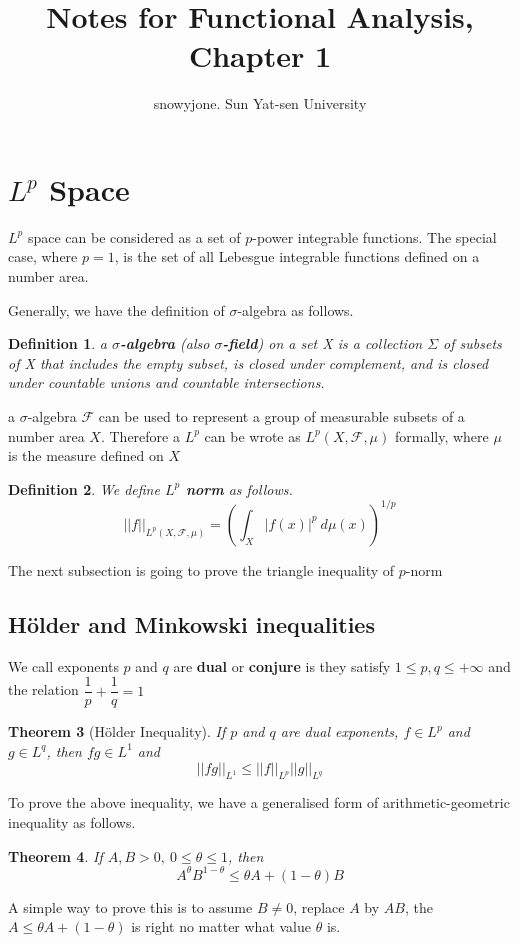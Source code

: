 \documentclass[11pt, a4paper]{article}
\theoremstyle{plain}
\newtheorem{thm}{Theorem}[section]
\newtheorem{defn}[thm]{Definition} %
\begin{document}
\title{Notes for Functional Analysis, Chapter 1}
\author{snowyjone. Sun Yat-sen University}
\maketitle

\section{$L^p$ Space}

$L^p$ space can be considered as a set of $p$-power integrable functions. The special case, where $p=1$, is the set of all Lebesgue integrable functions defined on a number area. 

Generally, we have the definition of $\sigma$-algebra as follows.
\begin{defn}
	a \textbf{$\sigma$-algebra} (also \textbf{$\sigma$-field}) on a set X is a collection $\Sigma$ of subsets of X that includes the empty subset, is closed under complement, and is closed under countable unions and countable intersections.
\end{defn}
a $\sigma$-algebra $\mathscr{F}$ can be used to represent a group of measurable subsets of a number area $X$. Therefore a $L^p$ can be wrote as $L^p(X,\mathscr{F},\mu)$ formally, where $\mu$ is the measure defined on $X$
\begin{defn}
	We define \textbf{$L^p$ norm} as follows.
	\[||f||_{L^p(X,\mathscr{F},\mu)}=\left(\int_X|f(x)|^p~d\mu(x)\right)^{1/p}\]
\end{defn}
The next subsection is going to prove the triangle inequality of $p$-norm

\subsection{H\"older and Minkowski inequalities}
We call exponents $p$ and $q$ are \textbf{dual} or \textbf{conjure} is they satisfy $1\le p,q\le+\infty$ and the relation $\dfrac{1}{p}+\dfrac{1}{q}=1$

\begin{thm}[H\"older Inequality]
	If $p$ and $q$ are dual exponents, $f\in L^p$ and $g\in L^q$, then $fg\in L^1$ and \[||fg||_{L^1}\le ||f||_{L^p}||g||_{L^q}\]
\end{thm}

To prove the above inequality, we have a generalised form of arithmetic-geometric inequality as follows.

\begin{thm}
	If $A,B>0,~0\le \theta\le 1$, then
	\[A^{\theta}B^{1-\theta}\le \theta A+(1-\theta)B\]
\end{thm}

A simple way to prove this is to assume $B\neq 0$, replace $A$ by $AB$, the $A\le \theta A+(1-\theta)$ is right no matter what value $\theta$ is. 
\end{document}
